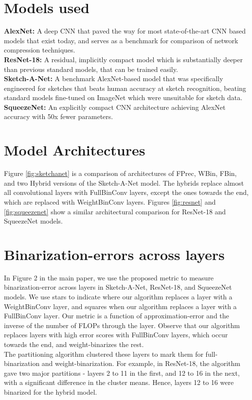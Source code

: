 \documentclass[10pt,twocolumn,letterpaper]{article}
\begin{document}
\section{Models used}{\bf AlexNet:} A deep CNN that paved the way for most state-of-the-art CNN based models that exist today, and serves as a benchmark for comparison of network compression techniques.\\
{\bf ResNet-18:} A residual, implicitly compact model which is substantially deeper than previous standard models, that can be trained easily. \\
{\bf Sketch-A-Net:} A benchmark AlexNet-based model that was specifically engineered for sketches that beats human accuracy at sketch recognition, beating standard models fine-tuned on ImageNet which were unsuitable for sketch data. \\
{\bf SqueezeNet:} An explicitly compact CNN architecture achieving AlexNet accuracy with 50x fewer parameters.\\

\section{Model Architectures}
Figure \ref{fig:sketchanet} is a comparison of architectures of FPrec, WBin, FBin, and two Hybrid versions of the Sketch-A-Net model. The hybrids replace almost all convolutional layers with FullBinConv layers, except the ones towards the end, which are replaced with WeightBinConv layers. Figures \ref{fig:resnet} and \ref{fig:squeezenet} show a similar architectural comparison for ResNet-18 and SqueezeNet models.  

\section{Binarization-errors across layers }
In Figure 2 in the main paper, we use the proposed metric to measure binarization-error across layers in Sketch-A-Net, ResNet-18, and SqueezeNet models. We use stars to indicate where our algorithm replaces a layer with a WeightBinConv layer, and squares when our algorithm replaces a layer with a FullBinConv layer. Our metric is a function of approximation-error and the inverse of the number of FLOPs through the layer. Observe that our algorithm replaces layers with high error scores with FullBinConv layers, which occur towards the end, and weight-binarizes the rest. \\
The partitioning algorithm clustered these layers to mark them for full-binarization and weight-binarization. For example, in ResNet-18, the algorithm gave two major partitions - layers 2 to 11 in the first, and 12 to 16 in the next, with a significant difference in the cluster means. Hence, layers 12 to 16 were binarized for the hybrid model.
\end{document}
